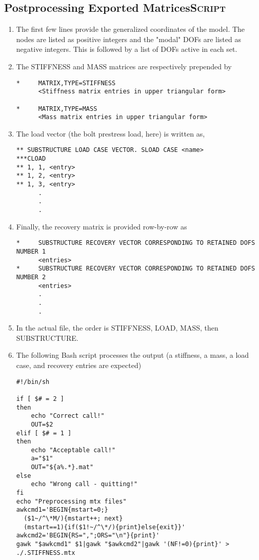 \documentclass[11pt]{article}
\begin{document}
\subsection{Postprocessing Exported Matrices\hfill{}\textsc{Script}}
\label{sec:bscr}
\begin{enumerate}
\item The first few lines provide the generalized coordinates of the model. The nodes are listed as positive integers and the "modal" DOFs are listed as negative integers.
This is followed by a list of DOFs active in each set.
\item The STIFFNESS and MASS matrices are respectively prepended by
\begin{verbatim}
*     MATRIX,TYPE=STIFFNESS
      <Stiffness matrix entries in upper triangular form>

*     MATRIX,TYPE=MASS
      <Mass matrix entries in upper triangular form>      
\end{verbatim}
\item The load vector (the bolt prestress load, here) is written as,
\begin{verbatim}
** SUBSTRUCTURE LOAD CASE VECTOR. SLOAD CASE <name>
***CLOAD 
** 1, 1, <entry>
** 1, 2, <entry>
** 1, 3, <entry>
      .
      .
      .
\end{verbatim}
\item Finally, the recovery matrix is provided row-by-row as
\begin{verbatim}
*     SUBSTRUCTURE RECOVERY VECTOR CORRESPONDING TO RETAINED DOFS NUMBER 1
      <entries>
*     SUBSTRUCTURE RECOVERY VECTOR CORRESPONDING TO RETAINED DOFS NUMBER 2
      <entries>
      .
      .
      .
\end{verbatim}
\item In the actual file, the order is STIFFNESS, LOAD, MASS, then SUBSTRUCTURE.
\item The following Bash script processes the output (a stiffness, a mass, a load case, and recovery entries are expected)
\begin{verbatim}
#!/bin/sh

if [ $# = 2 ]
then 
    echo "Correct call!"
    OUT=$2
elif [ $# = 1 ]
then
    echo "Acceptable call!"
    a="$1"
    OUT="${a%.*}.mat"
else
    echo "Wrong call - quitting!"
fi
echo "Preprocessing mtx files"
awkcmd1='BEGIN{mstart=0;}
  ($1~/^\*M/){mstart++; next}
  (mstart==1){if($1!~/^\*/){print}else{exit}}'
awkcmd2='BEGIN{RS=",";ORS="\n"}{print}'
gawk "$awkcmd1" $1|gawk "$awkcmd2"|gawk '(NF!=0){print}' > ./.STIFFNESS.mtx


\end{verbatim}
\end{enumerate}
\end{document}
